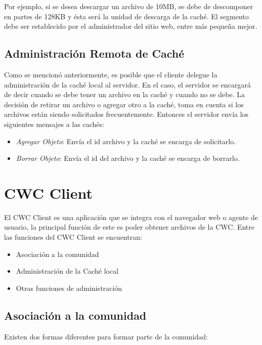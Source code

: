 Por ejemplo, si se desea descargar un archivo de 10MB, se debe de descomponer en partes de 128KB y ésta será la unidad de descarga de la caché. El segmento debe ser establecido por el administrador del sitio web, entre más pequeña mejor.

\subsection{Administración Remota de Caché}

Como se mencionó anteriormente, es posible que el cliente delegue la administración de la caché local al servidor. En el caso, el servidor se encargará de decir cuando se debe tener un archivo en la caché y cuando no se debe. La decisión de retirar un archivo o agregar otro a la caché, toma en cuenta si los archivos están siendo solicitados frecuentemente. Entonces el servidor envía los siguientes mensajes a las cachés:

\begin{itemize}
\item \textit{Agregar Objeto}: Envía el id archivo y la caché se encarga de solicitarlo.
\item \textit{Borrar Objeto}: Envía el id del archivo y la caché se encarga de borrarlo.
\end{itemize}

\section{CWC Client}
El CWC Client es una aplicación que se integra con el navegador web o agente de usuario, la principal función de este es poder obtener archivos de la CWC.  Entre las funciones del CWC Client se encuentran:

\begin{itemize}
\item Asociación a la comunidad
\item Administración de la Caché local
\item Otras funciones de administración
\end{itemize}

\subsection{Asociación a la comunidad}

Existen dos formas diferentes para formar parte de la comunidad:

